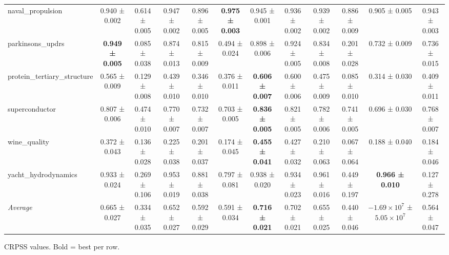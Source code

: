 \begin{table}[htbp]
{\begin{tabular}{lccccccccccc}
naval\_propulsion & 0.940 ± 0.002 & 0.614 ± 0.005 & 0.947 ± 0.002 & 0.896 ± 0.005 & \textbf{0.975 ± 0.003} & 0.945 ± 0.001 & 0.936 ± 0.002 & 0.939 ± 0.002 & 0.886 ± 0.009 & 0.905 ± 0.005 & 0.943 ± 0.003 \\
parkinsons\_updrs & \textbf{0.949 ± 0.005} & 0.085 ± 0.038 & 0.874 ± 0.013 & 0.815 ± 0.009 & 0.494 ± 0.024 & 0.898 ± 0.006 & 0.924 ± 0.005 & 0.834 ± 0.008 & 0.201 ± 0.028 & 0.732 ± 0.009 & 0.736 ± 0.015 \\
protein\_tertiary\_structure & 0.565 ± 0.009 & 0.129 ± 0.008 & 0.439 ± 0.010 & 0.346 ± 0.010 & 0.376 ± 0.011 & \textbf{0.606 ± 0.007} & 0.600 ± 0.006 & 0.475 ± 0.009 & 0.085 ± 0.010 & 0.314 ± 0.030 & 0.409 ± 0.011 \\
superconductor & 0.807 ± 0.006 & 0.474 ± 0.010 & 0.770 ± 0.007 & 0.732 ± 0.007 & 0.703 ± 0.005 & \textbf{0.836 ± 0.005} & 0.821 ± 0.005 & 0.782 ± 0.006 & 0.741 ± 0.005 & 0.696 ± 0.030 & 0.768 ± 0.007 \\
wine\_quality & 0.372 ± 0.043 & 0.136 ± 0.028 & 0.225 ± 0.038 & 0.201 ± 0.037 & 0.174 ± 0.045 & \textbf{0.455 ± 0.041} & 0.427 ± 0.032 & 0.210 ± 0.063 & 0.067 ± 0.064 & 0.188 ± 0.040 & 0.184 ± 0.046 \\
yacht\_hydrodynamics & 0.933 ± 0.024 & 0.269 ± 0.106 & 0.953 ± 0.019 & 0.881 ± 0.038 & 0.797 ± 0.081 & 0.938 ± 0.020 & 0.934 ± 0.023 & 0.961 ± 0.016 & 0.449 ± 0.197 & \textbf{0.966 ± 0.010} & 0.127 ± 0.278 \\
\midrule
\textit{Average} & 0.665 ± 0.027 & 0.334 ± 0.035 & 0.652 ± 0.027 & 0.592 ± 0.029 & 0.591 ± 0.034 & \textbf{0.716 ± 0.021} & 0.702 ± 0.021 & 0.655 ± 0.025 & 0.440 ± 0.046 & $-1.69\times10^{7}$ ± $5.05\times10^{7}$ & 0.564 ± 0.047 \\
\bottomrule
\end{tabular}
}
\par\smallskip\footnotesize{CRPSS values. Bold = best per row.}
\end{table}
